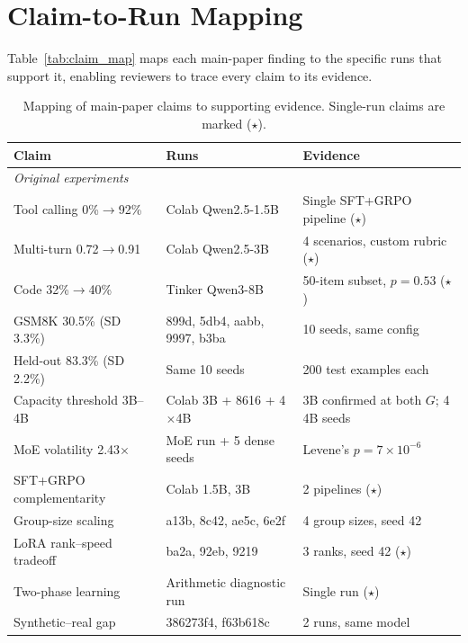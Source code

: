 \documentclass{article}
\begin{document}
\section{Claim-to-Run Mapping}

Table~\ref{tab:claim_map} maps each main-paper finding to the specific runs that support it, enabling reviewers to trace every claim to its evidence.

\begin{table}[htbp]
    \centering
    \footnotesize
    \caption{Mapping of main-paper claims to supporting evidence. Single-run claims are marked ($\star$).}
    \begin{tabular}{p{3.8cm}lp{4.5cm}}
        \toprule
        Claim & Runs & Evidence \\
        \midrule
        \multicolumn{3}{l}{\emph{Original experiments}} \\
        Tool calling 0\%$\rightarrow$92\% & Colab Qwen2.5-1.5B & Single SFT+GRPO pipeline ($\star$) \\
        Multi-turn 0.72$\rightarrow$0.91 & Colab Qwen2.5-3B & 4 scenarios, custom rubric ($\star$) \\
        Code 32\%$\rightarrow$40\% & Tinker Qwen3-8B & 50-item subset, $p{=}0.53$ ($\star$) \\
        GSM8K 30.5\% (SD 3.3\%) & 899d, 5db4, aabb, 9997, b3ba & 10 seeds, same config \\
        Held-out 83.3\% (SD 2.2\%) & Same 10 seeds & 200 test examples each \\
        Capacity threshold 3B--4B & Colab 3B + 8616 + 4$\times$4B & 3B confirmed at both $G$; 4 4B seeds \\
        MoE volatility 2.43$\times$ & MoE run + 5 dense seeds & Levene's $p{=}7{\times}10^{-6}$ \\
        SFT+GRPO complementarity & Colab 1.5B, 3B & 2 pipelines ($\star$) \\
        Group-size scaling & a13b, 8c42, ae5c, 6e2f & 4 group sizes, seed 42 \\
        LoRA rank--speed tradeoff & ba2a, 92eb, 9219 & 3 ranks, seed 42 ($\star$) \\
        Two-phase learning & Arithmetic diagnostic run & Single run ($\star$) \\
        Synthetic--real gap & 386273f4, f63b618c & 2 runs, same model \\

\end{tabular}
\end{table}
\end{document}

